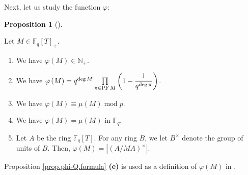 \documentclass[numbers=enddot,12pt,final,onecolumn,notitlepage]{scrartcl}%
\theoremstyle{definition}
\newtheorem{prop}[theo]{Proposition}
\newenvironment{proposition}[1][]
{\begin{prop}[#1]\begin{leftbar}}
{\end{leftbar}\end{prop}}
\let\prodnonlimits\prod
\renewcommand{\prod}{\prodnonlimits\limits}
\begin{document}
Next, let us study the function $\varphi$:

\begin{proposition}
\label{prop.phi-Q.formula}Let $M\in\mathbb{F}_{q}\left[  T\right]  _{+}$.

\begin{enumerate}
\item[\textbf{(a)}] We have $\varphi\left(  M\right)  \in\mathbb{N}_{+}$.

\item[\textbf{(b)}] We have $\varphi\left(  M\right)  =q^{\deg M}%
\prod\limits_{\pi\in\operatorname*{PF}M}\left(  1-\dfrac{1}{q^{\deg\pi}%
}\right)  $.

\item[\textbf{(c)}] We have $\varphi\left(  M\right)  \equiv\mu\left(
M\right)  \operatorname{mod}p$.

\item[\textbf{(d)}] We have $\varphi\left(  M\right)  =\mu\left(  M\right)  $
in $\mathbb{F}_{q}$.

\item[\textbf{(e)}] Let $A$ be the ring $\mathbb{F}_{q}\left[  T\right]  $.
For any ring $B$, we let $B^{\times}$ denote the group of units of $B$. Then,
$\varphi\left(  M\right)  =\left\vert \left(  A/MA\right)  ^{\times
}\right\vert $.
\end{enumerate}
\end{proposition}

Proposition \ref{prop.phi-Q.formula} \textbf{(e)} is used as a definition of
$\varphi\left(  M\right)  $ in \cite[\S 6]{kc-carlitz}.
\end{document}

